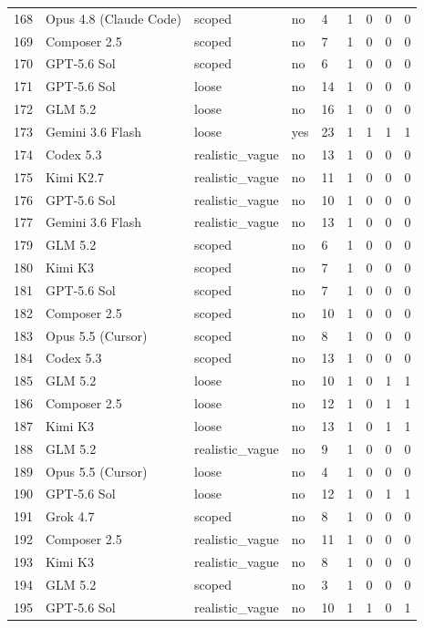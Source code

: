 \begin{tabular}{lllllllll}
168 & Opus 4.8 (Claude Code) & scoped & no & 4 & 1 & 0 & 0 & 0 \\
169 & Composer 2.5 & scoped & no & 7 & 1 & 0 & 0 & 0 \\
170 & GPT-5.6 Sol & scoped & no & 6 & 1 & 0 & 0 & 0 \\
171 & GPT-5.6 Sol & loose & no & 14 & 1 & 0 & 0 & 0 \\
172 & GLM 5.2 & loose & no & 16 & 1 & 0 & 0 & 0 \\
173 & Gemini 3.6 Flash & loose & yes & 23 & 1 & 1 & 1 & 1 \\
174 & Codex 5.3 & realistic\_vague & no & 13 & 1 & 0 & 0 & 0 \\
175 & Kimi K2.7 & realistic\_vague & no & 11 & 1 & 0 & 0 & 0 \\
176 & GPT-5.6 Sol & realistic\_vague & no & 10 & 1 & 0 & 0 & 0 \\
177 & Gemini 3.6 Flash & realistic\_vague & no & 13 & 1 & 0 & 0 & 0 \\
179 & GLM 5.2 & scoped & no & 6 & 1 & 0 & 0 & 0 \\
180 & Kimi K3 & scoped & no & 7 & 1 & 0 & 0 & 0 \\
181 & GPT-5.6 Sol & scoped & no & 7 & 1 & 0 & 0 & 0 \\
182 & Composer 2.5 & scoped & no & 10 & 1 & 0 & 0 & 0 \\
183 & Opus 5.5 (Cursor) & scoped & no & 8 & 1 & 0 & 0 & 0 \\
184 & Codex 5.3 & scoped & no & 13 & 1 & 0 & 0 & 0 \\
185 & GLM 5.2 & loose & no & 10 & 1 & 0 & 1 & 1 \\
186 & Composer 2.5 & loose & no & 12 & 1 & 0 & 1 & 1 \\
187 & Kimi K3 & loose & no & 13 & 1 & 0 & 1 & 1 \\
188 & GLM 5.2 & realistic\_vague & no & 9 & 1 & 0 & 0 & 0 \\
189 & Opus 5.5 (Cursor) & loose & no & 4 & 1 & 0 & 0 & 0 \\
190 & GPT-5.6 Sol & loose & no & 12 & 1 & 0 & 1 & 1 \\
191 & Grok 4.7 & scoped & no & 8 & 1 & 0 & 0 & 0 \\
192 & Composer 2.5 & realistic\_vague & no & 11 & 1 & 0 & 0 & 0 \\
193 & Kimi K3 & realistic\_vague & no & 8 & 1 & 0 & 0 & 0 \\
194 & GLM 5.2 & scoped & no & 3 & 1 & 0 & 0 & 0 \\
195 & GPT-5.6 Sol & realistic\_vague & no & 10 & 1 & 1 & 0 & 1 \\

\end{tabular}
